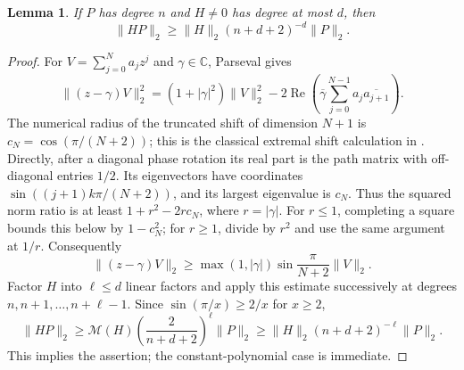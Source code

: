 \documentclass[11pt]{article}
\newtheorem{lemma}[theorem]{Lemma}\newtheorem{lemmaS}{Lemma}[section]
\theoremstyle{remark}\newtheorem{remark}[theorem]{Remark}
\newcommand{\C}{\mathbb C}
\newcommand{\norm}[1]{\lVert #1\rVert}
\newcommand{\Rea}{\operatorname{Re}}
\begin{document}
\begin{lemma}\label{lem:smallproduct}
If \(P\) has degree \(n\) and \(H\ne0\) has degree at most \(d\), then
\[
 \norm{HP}_2\ge\norm H_2(n+d+2)^{-d}\norm P_2.
\]
\end{lemma}
\begin{proof}
For \(V=\sum_{j=0}^Na_jz^j\) and \(\gamma\in\C\), Parseval gives
\[
 \norm{(z-\gamma)V}_2^2=(1+|\gamma|^2)\norm V_2^2
 -2\Rea\left(\overline\gamma
            \sum_{j=0}^{N-1}a_j\overline{a_{j+1}}\right).
\]
The numerical radius of the truncated shift of dimension \(N+1\)
is \(c_N=\cos(\pi/(N+2))\); this is the classical extremal shift
calculation in \cite{haagerup}. Directly, after a diagonal phase
rotation its real part is the path matrix with off-diagonal entries
\(1/2\). Its eigenvectors have coordinates
\(\sin((j+1)k\pi/(N+2))\), and its largest eigenvalue is \(c_N\).
Thus the squared norm ratio is at least \(1+r^2-2rc_N\), where
\(r=|\gamma|\). For \(r\le1\), completing a square bounds this
below by \(1-c_N^2\); for \(r\ge1\), divide by \(r^2\) and use
the same argument at \(1/r\). Consequently
\[
 \norm{(z-\gamma)V}_2\ge
 \max(1,|\gamma|)\sin\frac{\pi}{N+2}\norm V_2.
\]
Factor \(H\) into \(\ell\le d\) linear factors and apply this
estimate successively at degrees \(n,n+1,\ldots,n+\ell-1\).
Since \(\sin(\pi/x)\ge2/x\) for \(x\ge2\),
\[
 \norm{HP}_2\ge\mathcal M(H)
       \left(\frac2{n+d+2}\right)^\ell\norm P_2
 \ge\norm H_2(n+d+2)^{-\ell}\norm P_2.
\]
This implies the assertion; the constant-polynomial case is immediate.
\end{proof}
\end{document}
